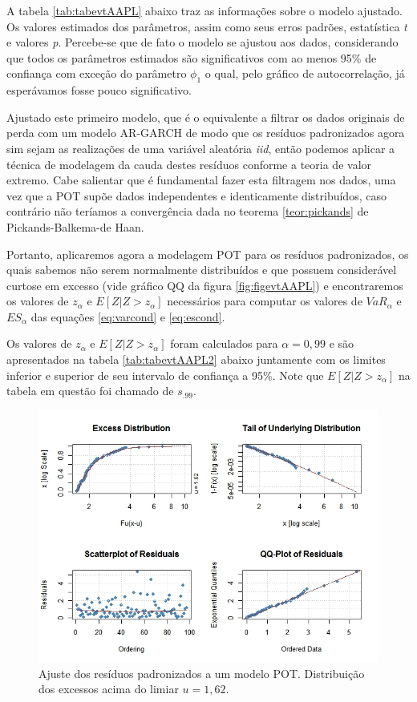 \documentclass[review]{elsarticle}
\theoremstyle{definition}
\begin{document}
A tabela \ref{tab:tabevtAAPL} abaixo traz as informações sobre o modelo ajustado. Os valores estimados dos parâmetros, assim como seus erros padrões, estatística \emph{t} e valores \emph{p}. Percebe-se que de fato o modelo se ajustou aos dados, considerando que todos os parâmetros estimados são significativos com ao menos 95\% de confiança com exceção do parâmetro $\phi_1$ o qual, pelo gráfico de autocorrelação, já esperávamos fosse pouco significativo.

Ajustado este primeiro modelo, que é o equivalente a filtrar os dados originais de perda com um modelo AR-GARCH de modo que os resíduos padronizados agora sim sejam as realizações de uma variável aleatória \emph{iid}, então podemos aplicar a técnica de modelagem da cauda destes resíduos conforme a teoria de valor extremo. Cabe salientar que é fundamental fazer esta filtragem nos dados, uma vez que a POT supõe dados independentes e identicamente distribuídos, caso contrário não teríamos a convergência dada no teorema \ref{teor:pickands} de Pickands-Balkema-de Haan.



Portanto, aplicaremos agora a modelagem POT para os resíduos padronizados, os quais sabemos não serem normalmente distribuídos e que possuem considerável curtose em excesso (vide gráfico QQ da figura \ref{fig:figevtAAPL}) e encontraremos os valores de $z_\alpha$ e $E[Z|Z>z_\alpha]$ necessários para computar os valores de $VaR_\alpha$ e $ES_\alpha$ das equações \eqref{eq:varcond} e \eqref{eq:escond}.

Os valores de $z_\alpha$ e $E[Z|Z>z_\alpha]$ foram calculados para $\alpha=0,99$ e são apresentados na tabela \ref{tab:tabevtAAPL2} abaixo juntamente com os limites  inferior e superior de seu intervalo de confiança a 95\%. Note que $E[Z|Z>z_\alpha]$ na tabela em questão foi chamado de $s_{.99}$.


\begin{figure}[h]
	\centering
	\includegraphics[width=0.9\linewidth]{figs/figevtAAPL2}
	\caption[Modelo POT de Apple Inc.]{Ajuste dos resíduos padronizados a um modelo POT. Distribuição dos excessos acima do limiar $u=1,62$.}
	\label{fig:figevtAAPL2}
\end{figure}
\end{document}
